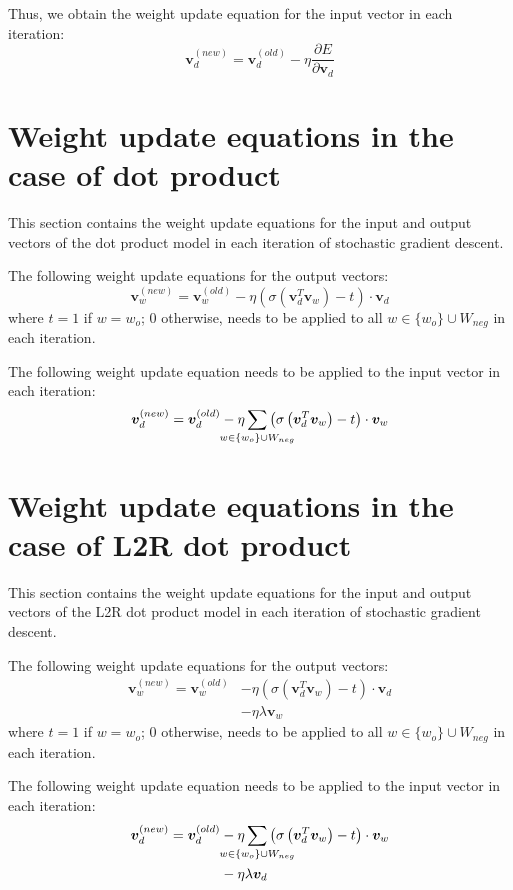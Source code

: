 \documentclass[11pt,a4paper]{article}
\begin{document}
Thus, we obtain the weight update equation for the input vector in each iteration: 
\begin{equation}
\mathbold{v}_d^{(new)} = \mathbold{v}_d^{(old)} - \eta \frac {\partial E} {\partial \mathbold{v}_d}
\end{equation}

\section{Weight update equations in the case of dot product}
This section contains the weight update equations for the input and output vectors of the dot product model in each iteration of stochastic gradient descent.

The following weight update equations for the output vectors:
\begin{equation}
\mathbold{v}_w^{(new)} = \mathbold{v}_w^{(old)} - \eta \left( \sigma \left( \mathbold{v}_d^T \mathbold{v}_w \right) - t \right) \cdot \mathbold{v}_d
\end{equation}
where $t = 1$ if $w = w_o$; $0$ otherwise, needs to be applied to all $w \in \{w_o\} \cup W_{neg}$ in each iteration.

The following weight update equation needs to be applied to the input vector in each iteration:
\begin{equation}
\mathbold{v}_d^{(new)} = \mathbold{v}_d^{(old)} - \eta \sum_{\mathclap{w \in \{w_o\} \cup W_{neg}}} \left( \sigma \left( \mathbold{v}_d^T \mathbold{v}_w \right) - t \right) \cdot \mathbold{v}_w
\end{equation}

\section{Weight update equations in the case of L2R dot product}
This section contains the weight update equations for the input and output vectors of the L2R dot product model in each iteration of stochastic gradient descent.

The following weight update equations for the output vectors:
\begin{align}
\mathbold{v}_w^{(new)} = \mathbold{v}_w^{(old)} &- \eta \left( \sigma \left( \mathbold{v}_d^T \mathbold{v}_w \right) - t \right) \cdot \mathbold{v}_d \nonumber \\
&- \eta \lambda \mathbold{v}_w
\end{align}
where $t = 1$ if $w = w_o$; $0$ otherwise, needs to be applied to all $w \in \{w_o\} \cup W_{neg}$ in each iteration.

The following weight update equation needs to be applied to the input vector in each iteration:
\begin{align}
\mathbold{v}_d^{(new)} = \mathbold{v}_d^{(old)} &- \eta \sum_{\mathclap{w \in \{w_o\} \cup W_{neg}}} \left( \sigma \left( \mathbold{v}_d^T \mathbold{v}_w \right) - t \right) \cdot \mathbold{v}_w \nonumber \\
&- \eta \lambda \mathbold{v}_d
\end{align}
\end{document}
